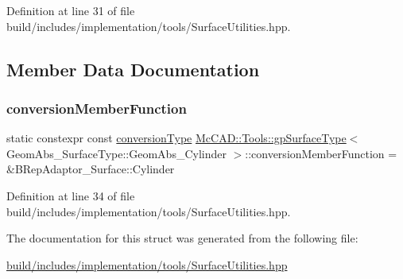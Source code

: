 Definition at line 31 of file build/includes/implementation/tools/\+Surface\+Utilities.\+hpp.



\subsection{Member Data Documentation}
\mbox{\label{structMcCAD_1_1Tools_1_1gpSurfaceType_3_01GeomAbs__SurfaceType_1_1GeomAbs__Cylinder_01_4_a3f2b735f93349bc3a142d121e7aea29c}} 
\subsubsection{\texorpdfstring{conversion\+Member\+Function}{conversionMemberFunction}}
{\footnotesize\ttfamily static constexpr const \hyperlink{structMcCAD_1_1Tools_1_1gpSurfaceType_3_01GeomAbs__SurfaceType_1_1GeomAbs__Cylinder_01_4_aeb0860ae6aba6767a3c8eecc5089087c}{conversion\+Type} \hyperlink{structMcCAD_1_1Tools_1_1gpSurfaceType}{Mc\+C\+A\+D\+::\+Tools\+::gp\+Surface\+Type}$<$ Geom\+Abs\+\_\+\+Surface\+Type\+::\+Geom\+Abs\+\_\+\+Cylinder $>$\+::conversion\+Member\+Function = \&B\+Rep\+Adaptor\+\_\+\+Surface\+::\+Cylinder\hspace{0.3cm}{\ttfamily [static]}}



Definition at line 34 of file build/includes/implementation/tools/\+Surface\+Utilities.\+hpp.



The documentation for this struct was generated from the following file\+:\begin{DoxyCompactItemize}
\item 
\hyperlink{build_2includes_2implementation_2tools_2SurfaceUtilities_8hpp}{build/includes/implementation/tools/\+Surface\+Utilities.\+hpp}\end{DoxyCompactItemize}
